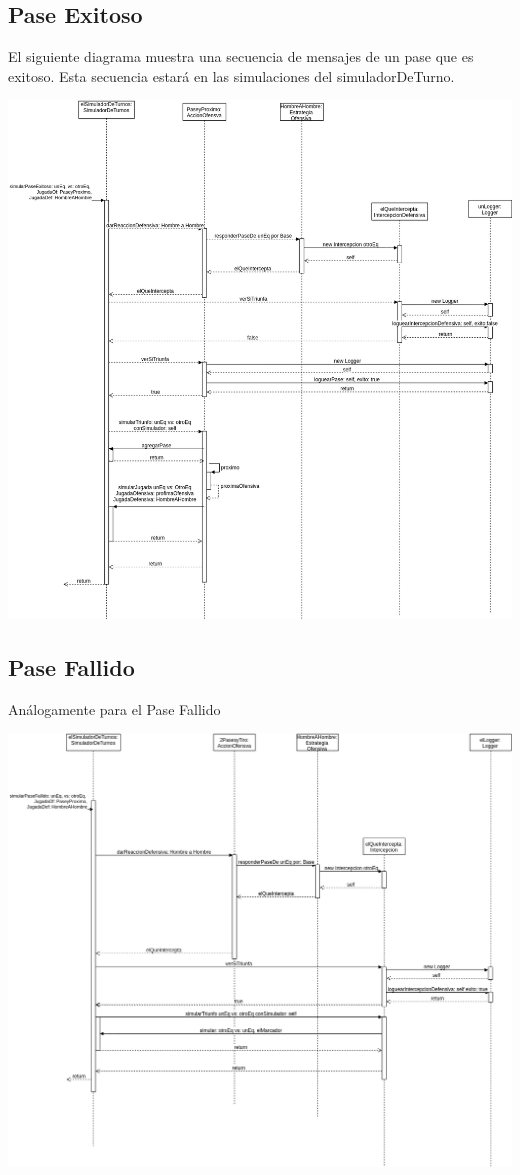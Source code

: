 \subsection{Pase Exitoso}

El siguiente diagrama muestra una secuencia de mensajes de un pase que es exitoso. Esta secuencia estará en las simulaciones del simuladorDeTurno.

\includegraphics[width=\textwidth]{imgs/PaseExitoso.png}

\subsection{Pase Fallido}

Análogamente para el Pase Fallido

\includegraphics[width=\textwidth]{imgs/PaseFallido.png}

